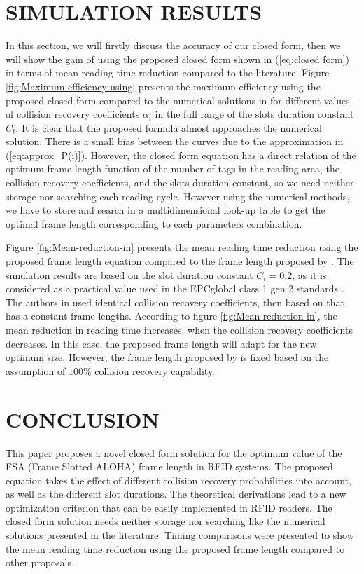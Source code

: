 \documentclass[10pt,conference,letterpaper]{RWWTemplate}
\begin{document}
\section{SIMULATION RESULTS}

In this section, we will firstly discuss the accuracy of our closed
form, then we will show the gain of using the proposed closed form
shown in (\ref{eq:closed form}) in terms of mean reading time reduction
compared to the literature. Figure \ref{fig:Maximum-efficiency-using}
presents the maximum efficiency using the proposed closed form compared
to the numerical solutions in \cite{CR_TA_2015} for different values
of collision recovery coefficients $\alpha_{i}$ in the full range
of the slots duration constant $C_{t}$. It is clear that the proposed
formula almost approaches the numerical solution. There is a small
bias between the curves due to the approximation in (\ref{eq:approx_P(i)}).
However, the closed form equation has a direct relation of the optimum
frame length function of the number of tags in the reading area, the
collision recovery coefficients, and the slots duration constant,
so we need neither storage nor searching each reading cycle. However
using the numerical methods, we have to store and search in a multidimensional
look-up table to get the optimal frame length corresponding to each
parameters combination.

Figure \ref{fig:Mean-reduction-in} presents the mean reading time
reduction using the proposed frame length equation compared to the
frame length proposed by \cite{2012_journal_CR}. The simulation results
are based on the slot duration constant $C_{t}=0.2$, as it is considered
as a practical value used in the EPCglobal class 1 gen 2 standards
\cite{standard}. The authors in \cite{2012_journal_CR} used identical
collision recovery coefficients, then based on that has a constant
frame lengths. According to figure \ref{fig:Mean-reduction-in}, the
mean reduction in reading time increases, when the collision recovery
coefficients decreases. In this case, the proposed frame length will
adapt for the new optimum size. However, the frame length proposed
by \cite{2012_journal_CR} is fixed based on the assumption of $100\%$
collision recovery capability. 


\section{CONCLUSION}

This paper proposes a novel closed form solution for the optimum value
of the FSA (Frame Slotted ALOHA) frame length in RFID systems. The
proposed equation takes the effect of different collision recovery
probabilities into account, as well as the different slot durations.
The theoretical derivations lead to a new optimization criterion that
can be easily implemented in RFID readers. The closed form solution
needs neither storage nor searching like the numerical solutions presented
in the literature. Timing comparisons were presented to show the mean
reading time reduction using the proposed frame length compared to
other proposals.
\end{document}
